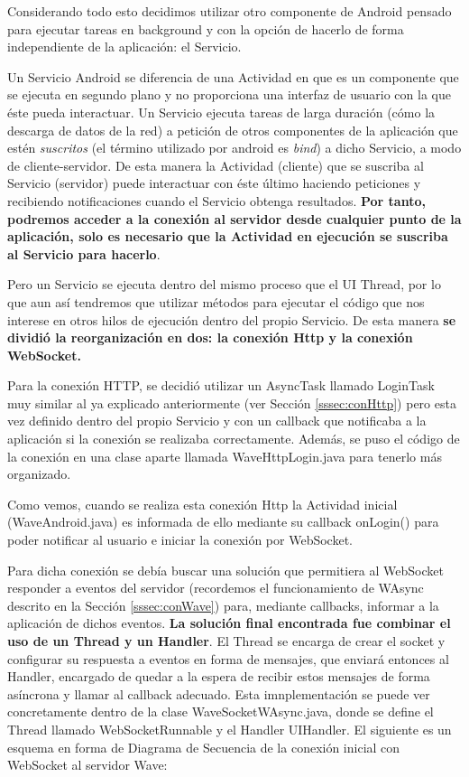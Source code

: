     Considerando todo esto decidimos utilizar otro componente de Android pensado para ejecutar tareas en background y con la opción de hacerlo de forma independiente de la aplicación: el Servicio\cite{ref:android_service}.

    Un Servicio Android se diferencia de una Actividad en que es un componente que se ejecuta en segundo plano y no proporciona una interfaz de usuario con la que éste pueda interactuar. Un Servicio ejecuta tareas de larga duración (cómo la descarga de datos de la red) a petición de otros componentes de la aplicación que estén \textit{suscritos} (el término utilizado por android es \textit{bind}) a dicho Servicio, a modo de cliente-servidor. De esta manera la Actividad (cliente) que se suscriba al Servicio (servidor) puede interactuar con éste último haciendo peticiones y recibiendo notificaciones cuando el Servicio obtenga resultados. \textbf{Por tanto, podremos acceder a la conexión al servidor desde cualquier punto de la aplicación, solo es necesario que la Actividad en ejecución se suscriba al Servicio para hacerlo}. 
    
    Pero un Servicio se ejecuta dentro del mismo proceso que el UI Thread, por lo que aun así tendremos que utilizar métodos para ejecutar el código que nos interese en otros hilos de ejecución dentro del propio Servicio. De esta manera \textbf{se dividió la reorganización en dos: la conexión Http y la conexión WebSocket.}
    
    Para la conexión HTTP, se decidió utilizar un AsyncTask llamado LoginTask muy similar al ya explicado anteriormente (ver Sección \ref{sssec:conHttp}) pero esta vez definido dentro del propio Servicio y con un callback que notificaba a la aplicación si la conexión se realizaba correctamente. Además, se puso el código de la conexión en una clase aparte llamada WaveHttpLogin.java para tenerlo más organizado.
    
    Como vemos, cuando se realiza esta conexión Http la Actividad inicial (WaveAndroid.java) es informada de ello mediante su callback onLogin() para poder notificar al usuario e iniciar la conexión por WebSocket. 
    
    Para dicha conexión se debía buscar una solución que permitiera al WebSocket responder a eventos del servidor (recordemos el funcionamiento de WAsync descrito en la Sección \ref{sssec:conWave}) para, mediante callbacks, informar a la aplicación de dichos eventos. \textbf{La solución final encontrada fue combinar el uso de un Thread y un Handler}. El Thread se encarga de crear el socket y configurar su respuesta a eventos en forma de mensajes, que enviará entonces al Handler, encargado de quedar a la espera de recibir estos mensajes de forma asíncrona y llamar al callback adecuado. Esta imnplementación se puede ver concretamente dentro de la clase WaveSocketWAsync.java, donde se define el Thread llamado WebSocketRunnable y el Handler UIHandler. El siguiente es un esquema en forma de Diagrama de Secuencia de la conexión inicial con WebSocket al servidor Wave:
    
